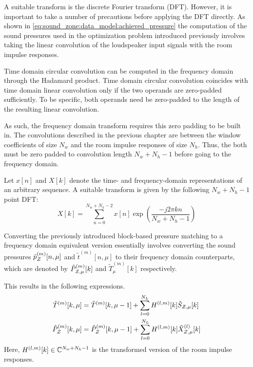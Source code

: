 A suitable transform is the discrete Fourier transform (DFT).
However, it is important to take a number of precautions before applying the DFT directly.
As shown in \autoref{eq:sound_zone:data_model:achieved_pressure} the computation of the sound pressures used in the optimization 
problem introduced previously involves taking the 
linear convolution of the loudspeaker input signals with the room impulse responses.

Time domain circular convolution can be computed in the frequency domain through the Hadamard product.
Time domain circular convolution coincides with time domain linear convolution only if the two operands are zero-padded sufficiently.
To be specific, both operands need be zero-padded to the length of the resulting linear convolution.

As such, the frequency domain transform requires this zero padding to be built in.
The convolutions described in the previous chapter are between the window coefficients of size $N_w$ 
and the room impulse responses of size $N_h$.
Thus, the both must be zero padded to convolution length $N_w + N_h - 1$ before going to the frequency domain.

Let $x[n]$ and $X[k]$ denote the time- and frequency-domain representations of an arbitrary sequence.  
A suitable transform is given by the following $N_w + N_h - 1$ point DFT:
\begin{equation}
    X[k] = \sum_{n=0}^{N_w + N_h - 2} x[n]\exp\left(\frac{-j2\pi k n}{N_w + N_h - 1}\right)
\end{equation}

Converting the previously introduced block-based pressure matching to a frequency domain equivalent version
essentially involves converting the sound pressures $\tilde{p}_{\mathcal{Z}}^{(m)}[n,\mu]$ and $\tilde{t}^{(m)}[n,\mu]$ 
to their frequency domain counterparts, which are denoted by $\tilde{P}_{\mathcal{Z},\mu}^{(m)}[k]$ and $\tilde{T}_\mu^{(m)}[k]$ respectively.

This results in the following expressions.
\begin{align}
    \tilde{T}^{(m)}[k, \mu] &= \tilde{T}^{(m)}[k, \mu - 1] + \sum_{l=0}^{N_L}H^{(l,m)}[k]\tilde{S}_{\mathcal{Z},\mu}[k] \\
    \tilde{P}_{\mathcal{Z}}^{(m)}[k, \mu] &= \tilde{P}_{\mathcal{Z}}^{(m)}[k, \mu - 1] 
        + \sum_{l=0}^{N_L}H^{(l,m)}[k]\tilde{X}^{(l)}_{\mathcal{Z},\mu}[k]  
\end{align}
Here, $H^{(l,m)}[k]\in\mathbb{C}^{N_w + N_h - 1}$ is the transformed version of the room impulse responses.

